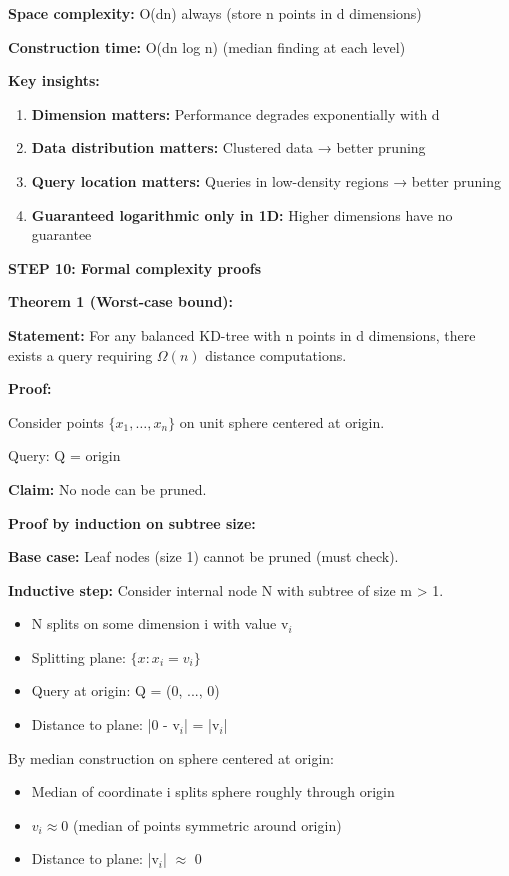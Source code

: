 \documentclass[12pt]{article}
\begin{document}
\begin{solution}
\textbf{Space complexity:} O(dn) always (store n points in d dimensions)

\textbf{Construction time:} O(dn log n) (median finding at each level)

\textbf{Key insights:}

\begin{enumerate}
    \item \textbf{Dimension matters:} Performance degrades exponentially with d
    \item \textbf{Data distribution matters:} Clustered data → better pruning
    \item \textbf{Query location matters:} Queries in low-density regions → better pruning
    \item \textbf{Guaranteed logarithmic only in 1D:} Higher dimensions have no guarantee
\end{enumerate}

\textbf{STEP 10: Formal complexity proofs}

\textbf{Theorem 1 (Worst-case bound):}

\textbf{Statement:} For any balanced KD-tree with n points in d dimensions, there exists a query requiring $\Omega(n)$ distance computations.

\textbf{Proof:}

Consider points $\{x_1, \ldots, x_n\}$ on unit sphere centered at origin.

Query: Q = origin

\textbf{Claim:} No node can be pruned.

\textbf{Proof by induction on subtree size:}

\textbf{Base case:} Leaf nodes (size 1) cannot be pruned (must check).

\textbf{Inductive step:} Consider internal node N with subtree of size m > 1.

\begin{itemize}
    \item N splits on some dimension i with value v$_i$
    \item Splitting plane: $\{x : x_i = v_i\}$
    \item Query at origin: Q = (0, ..., 0)
    \item Distance to plane: |0 - v$_i$| = |v$_i$|
\end{itemize}

By median construction on sphere centered at origin:
\begin{itemize}
    \item Median of coordinate i splits sphere roughly through origin
    \item $v_i \approx 0$ (median of points symmetric around origin)
    \item Distance to plane: |v$_i$| $\approx$ 0
\end{itemize}


\end{solution}
\end{document}

